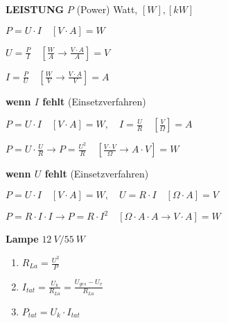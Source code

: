 \textbf{LEISTUNG} $P$ (Power) Watt, $[W], [kW]$

$\boxed{P = U \cdot I} \quad [V \cdot A] = W$

$\boxed{U = \frac{P}{I}} \quad [\frac{W}{A} \to \frac{V \cdot A}{A}] = V$

$\boxed{I = \frac{P}{U}} \quad [\frac{W}{V} \to \frac{V \cdot A}{V}] = A$

\textbf{wenn $I$ fehlt} (Einsetzverfahren)

$P = U \cdot I \quad [V \cdot A] = W, \quad I = \frac{U}{R} \quad [\frac{V}{\Omega}] = A$

$P = U \cdot \frac{U}{R} \to \boxed{P = \frac{U^2}{R}} \quad [\frac{V \cdot V}{\Omega} \to A \cdot V] = W$

\textbf{wenn $U$ fehlt} (Einsetzverfahren)

$P = U \cdot I \quad [V \cdot A] = W, \quad U = R \cdot I \quad [\Omega \cdot A] = V$

$P = R \cdot I \cdot I \to \boxed{P = R \cdot I^2} \quad [\Omega \cdot A \cdot A \to V \cdot A] = W$

\textbf{Lampe} $12~V/55~W$

\begin{enumerate}
\item
  $R_{La} = \frac{U^2}{P}$
\item
  $I_{tat} = \frac{U_k}{R_{La}} = \frac{U_{ges} - U_v}{R_{La}}$
\item
  $P_{tat} = U_k \cdot I_{tat}$
\end{enumerate}
